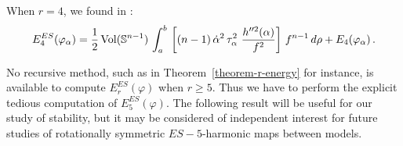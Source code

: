 \documentclass[11pt]{amsart}
\theoremstyle{plain}
\theoremstyle{definition}
\numberwithin{equation}{section}
\def \s{{\mathbb S}}
\numberwithin{equation}{section}
\begin{document}
When $r=4$, we found in \cite{BMOR1}:
\begin{equation} \label{4-ES-energy-rot-symm-maps}
E^{ES}_4(\varphi_\alpha)= \frac{1}{2}\,{\rm Vol}(\s^{n-1})\,\int_a^b\,\left [(n-1)\,\dot{\alpha}^2 \,\tau^2_\alpha\, \,\frac{h''^2 (\alpha)}{f^2} \right] \, f^{n-1}\,d\rho +E_4(\varphi_\alpha)\,.
\end{equation}

No recursive method, such as in Theorem~\ref{theorem-r-energy} for instance, is available to compute $E_r^{ES}(\varphi)$ when $r \geq 5$. Thus we have to perform the explicit tedious computation of $E^{ES}_5(\varphi)$. The following result will be useful for our study of stability, but it may be considered of independent interest for future studies of rotationally symmetric $ES-5$-harmonic maps between models.
\end{document}
